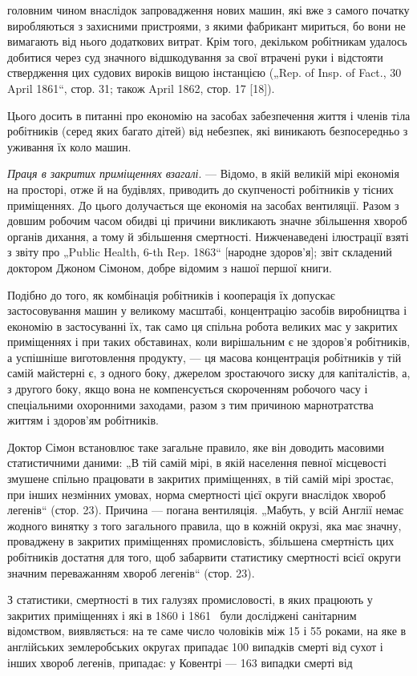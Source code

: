 \parcont{}  %
головним чином внаслідок запровадження нових машин, які вже
з самого початку виробляються з захисними пристроями, з якими
фабрикант мириться, бо вони не вимагають від нього додаткових
витрат. Крім того, декільком робітникам удалось добитися через
суд значного відшкодування за свої втрачені руки і відстояти ствердження цих судових вироків вищою
інстанцією („Rep. of
Insp. of Fact., 30 April 1861“, стор. 31; також April 1862, стор. 17 [18]).

Цього досить в питанні про економію на засобах забезпечення
життя і членів тіла робітників (серед яких багато дітей) від небезпек, які виникають безпосередньо з
уживання їх коло машин.

\emph{Праця в закритих приміщеннях взагалі}. — Відомо, в якій
великій мірі економія на просторі, отже й на будівлях, приводить до скупченості робітників у тісних
приміщеннях. До цього
долучається ще економія на засобах вентиляції. Разом з довшим
робочим часом обидві ці причини викликають значне збільшення
хвороб органів дихання, а тому й збільшення смертності. Нижченаведені ілюстрації взяті з звіту про
„Public Health, 6-th Rep.
1863“ [народне здоров’я]; звіт складений доктором Джоном
Сімоном, добре відомим з нашої першої книги.

Подібно до того, як комбінація робітників і кооперація їх
допускає застосовування машин у великому масштабі, концентрацію засобів виробництва і економію в
застосуванні їх, так
само ця спільна робота великих мас у закритих приміщеннях
і при таких обставинах, коли вирішальним є не здоров’я робітників, а успішніше виготовлення
продукту, — ця масова концентрація робітників у тій самій майстерні є, з одного боку,
джерелом зростаючого зиску для капіталістів, а, з другого боку,
якщо вона не компенсується скороченням робочого часу і спеціальними охоронними заходами, разом з тим
причиною марнотратства життям і здоров’ям робітників.

Доктор Сімон встановлює таке загальне правило, яке він доводить масовими статистичними даними: „В
тій самій мірі, в якій
населення певної місцевості змушене спільно працювати в закритих приміщеннях, в тій самій мірі
зростає, при інших
незмінних умовах, норма смертності цієї округи внаслідок
хвороб легенів“ (стор. 23). Причина — погана вентиляція. „Мабуть, у всій Англії немає жодного
винятку з того загального
правила, що в кожній окрузі, яка має значну, проваджену
в закритих приміщеннях промисловість, збільшена смертність
цих робітників достатня для того, щоб забарвити статистику
смертності всієї округи значним переважанням хвороб легенів“
(стор. 23).

З статистики, смертності в тих галузях промисловості, в яких
працюють у закритих приміщеннях і які в 1860 і 1861~ були
досліджені санітарним відомством, виявляється: на те саме число
чоловіків між 15 і 55 роками, на яке в англійських землеробських округах припадає 100 випадків
смерті від сухот і інших
хвороб легенів, припадає: у Ковентрі — 163 випадки смерті від
\parbreak{}  %
